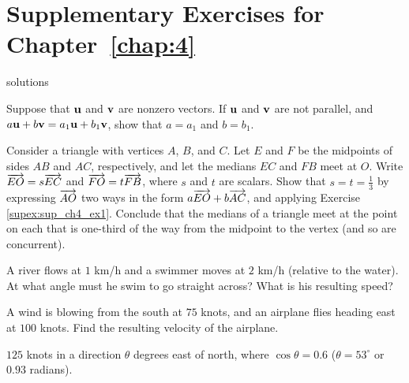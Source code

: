 \section*{Supplementary Exercises for Chapter~\ref{chap:4}}

\begin{Filesave}{solutions}
\end{Filesave}

\begin{multicols}{2}
\begin{supex} \label{supex:sup_ch4_ex1}
Suppose that $\textbf{u}$ and $\textbf{v}$ are nonzero vectors. If $\textbf{u}$ and $\textbf{v}$ are not parallel, and $a\textbf{u} + b\textbf{v} = a_{1}\textbf{u} + b_{1}\textbf{v}$, show that $a = a_{1}$ and $b = b_{1}$.

\end{supex}

\begin{supex}
Consider a triangle with vertices $A$, $B$, and $C$. Let $E$ and $F$ be the midpoints of sides $AB$ and $AC$, respectively, and let the medians $EC$ and $FB$ meet at $O$. Write $\overrightarrow{EO} = s\overrightarrow{EC}$ and $\overrightarrow{FO} = t\overrightarrow{FB}$, where $s$ and $t$ are scalars. Show that $s = t = \frac{1}{3}$ by expressing $\overrightarrow{AO}$ two ways in the form $a\overrightarrow{EO} + b\overrightarrow{AC}$, and applying Exercise \ref{supex:sup_ch4_ex1}. Conclude that the medians of a triangle meet at the point on each that is one-third of the way from the midpoint to the vertex (and so are concurrent).

\end{supex}

\begin{supex}
A river flows at $1$ km/h and a swimmer moves at $2$ km/h (relative to the water). At what angle must he swim to go straight across? What is his resulting speed?

\end{supex}

\begin{supex}
A wind is blowing from the south at $75$ knots, and an airplane flies heading east at $100$ knots. Find the resulting velocity of the airplane.

\begin{supsol}
$125$ knots in a direction $\theta$ degrees east of north, where $\cos\theta = 0.6$ ($\theta = 53^\circ$  or $0.93$ radians).


\end{supsol}
\end{supex}
\end{multicols}
